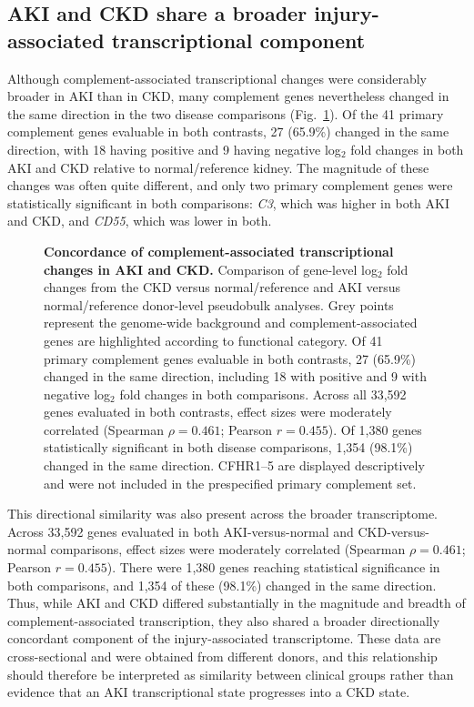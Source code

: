 \documentclass[10pt,letterpaper]{article}
\begin{document}
\subsection*{AKI and CKD share a broader injury-associated transcriptional component}

Although complement-associated transcriptional changes were considerably broader in AKI than in CKD, many complement genes nevertheless changed in the same direction in the two disease comparisons (Fig.~\ref{fig:disease_concordance}). Of the 41 primary complement genes evaluable in both contrasts, 27 (65.9\%) changed in the same direction, with 18 having positive and 9 having negative log$_2$ fold changes in both AKI and CKD relative to normal/reference kidney. The magnitude of these changes was often quite different, and only two primary complement genes were statistically significant in both comparisons: \textit{C3}, which was higher in both AKI and CKD, and \textit{CD55}, which was lower in both.

\begin{figure}[!h]
\caption{\textbf{Concordance of complement-associated transcriptional changes in AKI and CKD.}
Comparison of gene-level log$_2$ fold changes from the CKD versus normal/reference and AKI versus normal/reference donor-level pseudobulk analyses. Grey points represent the genome-wide background and complement-associated genes are highlighted according to functional category. Of 41 primary complement genes evaluable in both contrasts, 27 (65.9\%) changed in the same direction, including 18 with positive and 9 with negative log$_2$ fold changes in both comparisons. Across all 33,592 genes evaluated in both contrasts, effect sizes were moderately correlated (Spearman $\rho=0.461$; Pearson $r=0.455$). Of 1,380 genes statistically significant in both disease comparisons, 1,354 (98.1\%) changed in the same direction. CFHR1--5 are displayed descriptively and were not included in the prespecified primary complement set.}
\label{fig:disease_concordance}
\end{figure}

This directional similarity was also present across the broader transcriptome. Across 33,592 genes evaluated in both AKI-versus-normal and CKD-versus-normal comparisons, effect sizes were moderately correlated (Spearman $\rho=0.461$; Pearson $r=0.455$). There were 1,380 genes reaching statistical significance in both comparisons, and 1,354 of these (98.1\%) changed in the same direction. Thus, while AKI and CKD differed substantially in the magnitude and breadth of complement-associated transcription, they also shared a broader directionally concordant component of the injury-associated transcriptome. These data are cross-sectional and were obtained from different donors, and this relationship should therefore be interpreted as similarity between clinical groups rather than evidence that an AKI transcriptional state progresses into a CKD state.
\end{document}
